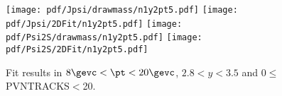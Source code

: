 \begin{figure}[H]
\begin{center}
\texttt{[image: pdf/Jpsi/drawmass/n1y2pt5.pdf]}
\texttt{[image: pdf/Jpsi/2DFit/n1y2pt5.pdf]}
\vspace*{-0.5cm}
\texttt{[image: pdf/Psi2S/drawmass/n1y2pt5.pdf]}
\texttt{[image: pdf/Psi2S/2DFit/n1y2pt5.pdf]}
\vspace*{-0.5cm}
\end{center}
\caption{Fit results in $8\gevc<\pt<20\gevc$, $2.8<y<3.5$ and 0$\leq$PVNTRACKS$<$20.}
\label{Fitn1y2pt5}
\end{figure}
